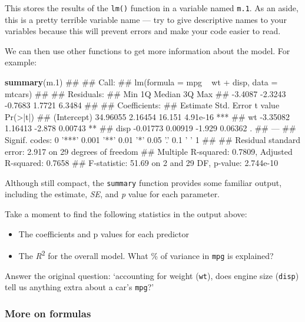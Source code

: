 \documentclass[]{article}
\newenvironment{Shaded}{\begin{snugshade}}{\end{snugshade}}
\newcommand{\KeywordTok}[1]{\textcolor[rgb]{0.13,0.29,0.53}{\textbf{#1}}}
\newcommand{\DecValTok}[1]{\textcolor[rgb]{0.00,0.00,0.81}{#1}}
\newcommand{\NormalTok}[1]{#1}
\providecommand{\tightlist}{%
  \setlength{\itemsep}{0pt}\setlength{\parskip}{0pt}}
\theoremstyle{definition}
\theoremstyle{definition}
\theoremstyle{definition}
\theoremstyle{remark}
\begin{document}
This stores the results of the \texttt{lm()} function in a variable
named \texttt{m.1}. As an aside, this is a pretty terrible variable name
--- try to give descriptive names to your variables because this will
prevent errors and make your code easier to read.

We can then use other functions to get more information about the model.
For example:

\begin{Shaded}
\begin{Highlighting}[]
\KeywordTok{summary}\NormalTok{(m.}\DecValTok{1}\NormalTok{)}
\NormalTok{## }
\NormalTok{## Call:}
\NormalTok{## lm(formula = mpg ~ wt + disp, data = mtcars)}
\NormalTok{## }
\NormalTok{## Residuals:}
\NormalTok{##     Min      1Q  Median      3Q     Max }
\NormalTok{## -3.4087 -2.3243 -0.7683  1.7721  6.3484 }
\NormalTok{## }
\NormalTok{## Coefficients:}
\NormalTok{##             Estimate Std. Error t value Pr(>|t|)    }
\NormalTok{## (Intercept) 34.96055    2.16454  16.151 4.91e-16 ***}
\NormalTok{## wt          -3.35082    1.16413  -2.878  0.00743 ** }
\NormalTok{## disp        -0.01773    0.00919  -1.929  0.06362 .  }
\NormalTok{## ---}
\NormalTok{## Signif. codes:  0 '***' 0.001 '**' 0.01 '*' 0.05 '.' 0.1 ' ' 1}
\NormalTok{## }
\NormalTok{## Residual standard error: 2.917 on 29 degrees of freedom}
\NormalTok{## Multiple R-squared:  0.7809, Adjusted R-squared:  0.7658 }
\NormalTok{## F-statistic: 51.69 on 2 and 29 DF,  p-value: 2.744e-10}
\end{Highlighting}
\end{Shaded}

Although still compact, the \texttt{summary} function provides some
familiar output, including the estimate, \emph{SE}, and \emph{p} value
for each parameter.

Take a moment to find the following statistics in the output above:

\begin{itemize}
\tightlist
\item
  The coefficients and p values for each predictor
\item
  The \emph{R}\textsuperscript{2} for the overall model. What \% of
  variance in \texttt{mpg} is explained?
\end{itemize}

Answer the original question: `accounting for weight (\texttt{wt}), does
engine size (\texttt{disp}) tell us anything extra about a car's
\texttt{mpg}?'

\subsubsection*{More on formulas}\label{more-on-formulas}
\end{document}
